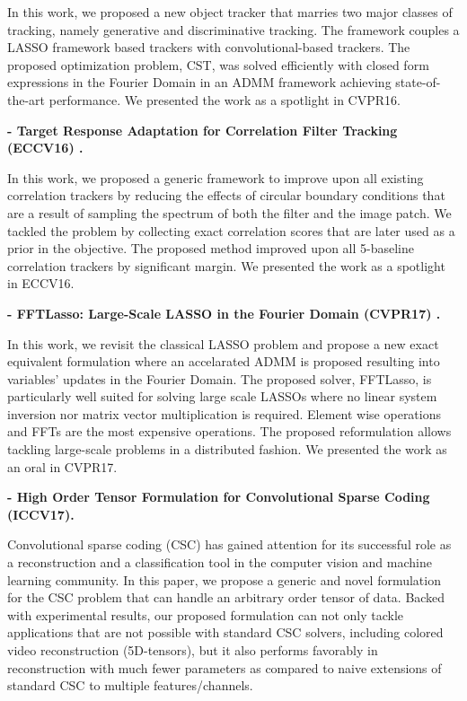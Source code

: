 \documentclass[article]{llncs}
\begin{document}
In this work, we proposed a new object tracker that marries two major classes of tracking, namely generative and discriminative tracking. The framework couples a LASSO framework based trackers with convolutional-based trackers. The proposed optimization problem, CST, was solved efficiently with closed form expressions in the Fourier Domain in an ADMM framework achieving state-of-the-art performance. We presented the work as a spotlight in CVPR16.
\newline

\noindent \textbf{- Target Response Adaptation for Correlation Filter Tracking (ECCV16) \cite{bibi2016target}.}

In this work, we proposed a generic framework to improve upon all existing correlation trackers by reducing the effects of circular boundary conditions that are a result of sampling the spectrum of both the filter and the image patch. We tackled the problem by collecting exact correlation scores that are later used as a prior in the objective. The proposed method improved upon all 5-baseline correlation trackers by significant margin. We presented the work as a spotlight in ECCV16.
\newline

\noindent \textbf{- FFTLasso: Large-Scale LASSO in the Fourier Domain (CVPR17) \cite{bibi2017fftlasso}.}

In this work, we revisit the classical LASSO problem and propose a new exact equivalent formulation where an accelarated ADMM is proposed resulting into variables' updates in the Fourier Domain. The proposed solver, FFTLasso, is particularly well suited for solving large scale LASSOs where no linear system inversion nor matrix vector multiplication is required. Element wise operations and FFTs are the most expensive operations. The proposed reformulation allows tackling large-scale problems in a distributed fashion. We presented the work as an oral in CVPR17.
\newline

\noindent \textbf{- High Order Tensor Formulation for Convolutional Sparse Coding (ICCV17).}

Convolutional sparse coding (CSC) has gained attention for its successful role as a reconstruction and a classification
tool in the computer vision and machine learning community. In this paper, we propose a generic and
novel formulation for the CSC problem that can handle an arbitrary order tensor of data. Backed with experimental results, our proposed formulation can not only tackle applications that are not possible with standard CSC solvers, including colored video reconstruction (5D-tensors), but it also performs favorably in reconstruction with much fewer
parameters as compared to naive extensions of standard CSC to multiple features/channels.
\newline
\end{document}
